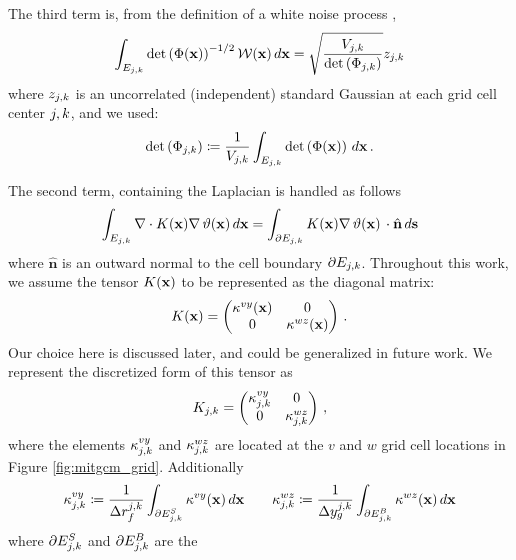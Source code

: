 The third term is, from the definition of a white noise process
\citep{adler_random_2007},
\begin{equation*}
    \int_{E_{j,k}}\text{det}\left(\Phi(\mathbf{x})\right)^{-1/2}\mathcal{W}(\mathbf{x}) \, d\mathbf{x}
        = \sqrt{\dfrac{V_{j,k}}{\text{det}\left(\Phi_{{j,k}}\right)}} z_{j,k}
\end{equation*}
where $z_{j,k}$ is an uncorrelated (independent) standard Gaussian at each grid
cell center ${j,k}$, and we used:
\begin{equation*}
    \text{det}\left(\Phi_{{j,k}}\right) \coloneqq
    \dfrac{1}{V_{j,k}}\int_{E_{j,k}}\text{det}\left(\Phi(\mathbf{x})\right)\,d\mathbf{x}\,.
\end{equation*}

The second term, containing the Laplacian is handled as follows
\begin{equation*}
    \int_{E_{j,k}} \nabla\cdot K(\mathbf{x})\nabla\,\vartheta(\mathbf{x})\,d\mathbf{x}
    =\int_{\partial E_{j,k}} K(\mathbf{x})\nabla\,\vartheta(\mathbf{x})\,
    \cdot \hat{\mathbf{n}} \, d\mathbf{s}
\end{equation*}
where $\hat{\mathbf{n}}$ is an outward normal to the cell boundary
$\partial E_{j,k}$.
Throughout this work, we assume the tensor $K(\mathbf{x})$ to be represented as the
diagonal matrix:
\begin{equation*}
    K(\mathbf{x}) =
    \begin{pmatrix}
        \kappa^{vy}(\mathbf{x}) & 0 \\
        0 & \kappa^{wz}(\mathbf{x}) \\
    \end{pmatrix} \, .
\end{equation*}
Our choice here is discussed later, and could be generalized in future work.
We represent the
discretized form of this tensor as
\begin{equation*}
    K_{j,k} =
    \begin{pmatrix}
        \kappa^{vy}_{j,k} & 0 \\
        0 & \kappa^{wz}_{j,k} \\
    \end{pmatrix} \, ,
\end{equation*}
where the elements $\kappa^{vy}_{j,k}$ and $\kappa^{wz}_{j,k}$
are located at the $v$ and $w$ grid cell locations in Figure
\ref{fig:mitgcm_grid}.
Additionally
\begin{equation*}
    \kappa^{vy}_{{j,k}} \coloneqq \dfrac{1}{\Delta r_f^{{j,k}}}
    \int_{\partial E_{{j,k}}^{S}} \kappa^{vy}(\mathbf{x})\,d\mathbf{x}
    \qquad
    \kappa^{wz}_{{j,k}} \coloneqq \dfrac{1}{\Delta y_g^{{j,k}}}
    \int_{\partial E_{{j,k}}^{B}} \kappa^{wz}(\mathbf{x})\,d\mathbf{x}
\end{equation*}
where $\partial E_{{j,k}}^{S}$ and $\partial E_{{j,k}}^{B}$ are the
